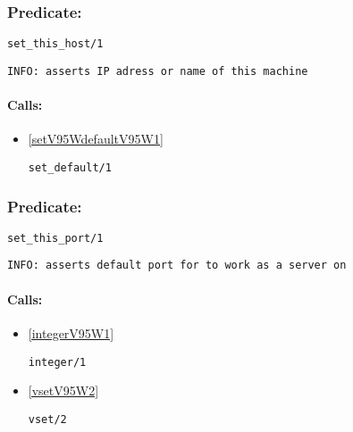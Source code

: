\subsubsection{Predicate:} \label{setV95WthisV95WhostV95W1}

\begin{verbatim}
set_this_host/1
\end{verbatim}

{\small \begin{verbatim}
INFO: asserts IP adress or name of this machine

\end{verbatim}}
\paragraph{Calls:} 
\begin{itemize}
\item \ref{setV95WdefaultV95W1} 
\begin{verbatim}
set_default/1
\end{verbatim}

\end{itemize}

\subsubsection{Predicate:} \label{setV95WthisV95WportV95W1}

\begin{verbatim}
set_this_port/1
\end{verbatim}

{\small \begin{verbatim}
INFO: asserts default port for to work as a server on

\end{verbatim}}
\paragraph{Calls:} 
\begin{itemize}
\item \ref{integerV95W1} 
\begin{verbatim}
integer/1
\end{verbatim}

\item \ref{vsetV95W2} 
\begin{verbatim}
vset/2
\end{verbatim}

\end{itemize}

